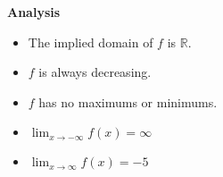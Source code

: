 \documentclass{ximera}
\begin{document}
\begin{example}
\begin{image}
\end{image}






\textbf{\textcolor[rgb]{0.59,0.0,0.09}{Analysis}} \\

\begin{itemize}
\item The implied domain of $f$ is $\mathbb{R}$.
\item $f$ is always decreasing.
\item $f$ has no maximums or minimums.
\item $\lim_{x \to -\infty} f(x) = \infty$
\item $\lim_{x \to \infty} f(x) = -5$
\end{itemize}


\end{example}
\end{document}
